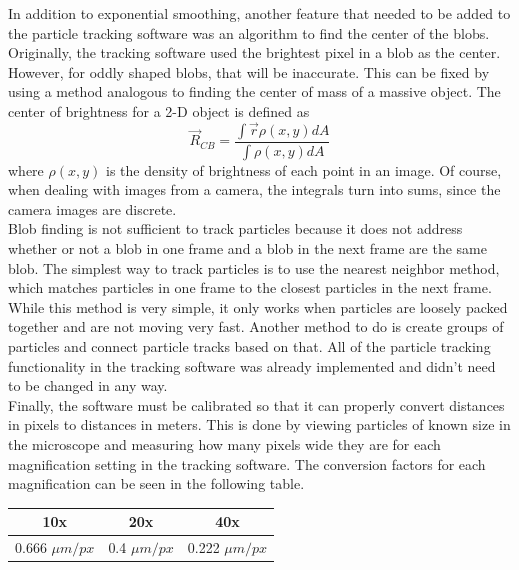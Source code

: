 \documentclass[11pt,letterpaper]{article}
\begin{document}
In addition to exponential smoothing, another feature that needed to be added to
the particle tracking software was an algorithm to find the center of the blobs.
Originally, the tracking software used the brightest pixel in a blob as the
center. However, for oddly shaped blobs, that will be inaccurate. This can be
fixed by using a method analogous to finding the center of mass of a massive
object. The center of brightness for a 2-D object is defined as
\begin{equation}
    \vec{R}_{CB} = \frac{\int \vec{r} \rho\left(x,y\right) dA}
    {\int \rho\left(x,y\right) dA}
\end{equation}
where $\rho \left(x,y\right)$ is the density of brightness of each point in an
image. Of course, when dealing with images from a camera, the integrals turn
into sums, since the camera images are discrete.\\

Blob finding is not sufficient to track particles because it does not address
whether or not a blob in one frame and a blob in the next frame are the same
blob. The simplest way to track particles is to use the nearest neighbor method,
which matches particles in one frame to the closest particles in the next frame.
While this method is very simple, it only works when particles are loosely
packed together and are not moving very fast. Another method to do is create
groups of particles and connect particle tracks based on that. All of the
particle tracking functionality in the tracking software was already implemented
and didn't need to be changed in any way.\\

Finally, the software must be calibrated so that it can properly convert
distances in pixels to distances in meters. This is done by viewing particles of
known size in the microscope and measuring how many pixels wide they are for
each magnification setting in the tracking software. The conversion factors for
each magnification can be seen in the following table.

\begin{center}
    \begin{tabular}{| c | c | c |}
        \hline
        10x & 20x & 40x\\
        \hline
        0.666 $\mu m / px$ & 0.4 $\mu m / px$ & 0.222 $\mu m / px$ \\
        \hline
    \end{tabular}
\end{center}
\end{document}
